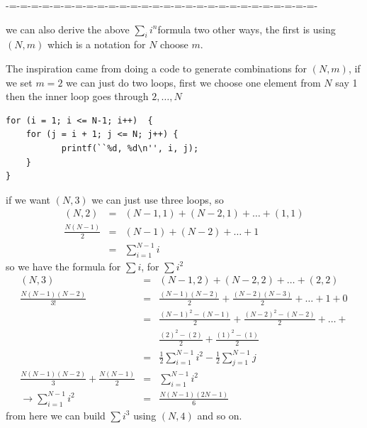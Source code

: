 \documentclass[aps,preprint,preprintnumbers,nofootinbib,showpacs,prd]{revtex4-1}
\newcommand{\nbea}{\begin{eqnarray*}}
\newcommand{\neea}{\end{eqnarray*}}
\begin{document}
-=-=-=-=-=-=-=-=-=-=-=-=-=-=-=-=-=-=-=-=-=-=-=-=-=-=-=-=-

we can also derive the above $\sum_{i} i^n$formula two other ways, the first is using $(N,m)$ which is a notation for $N$ choose $m$.

The inspiration came from doing a code to generate combinations for $(N,m)$, if we set $m=2$ we can just do two loops, first we choose one element from $N$ say 1 then the inner loop goes through $2,\dots,N$
%
\begin{Verbatim}[baselinestretch=0.75]
for (i = 1; i <= N-1; i++)  {
    for (j = i + 1; j <= N; j++) {
    	   printf(``%d, %d\n'', i, j);
    }
}
\end{Verbatim}
%
if we want $(N,3)$ we can just use three loops, so
%
\nbea
(N, 2) & = & (N-1,1) + (N-2,1) + \dots + (1,1) \\
\frac{N(N-1)}{2} & = & (N-1) + (N-2) + \dots + 1 \\
& = & \sum_{i=1}^{N-1} i
\neea
%
so we have the formula for $\sum i$, for $\sum i^2$
%
\nbea
(N, 3) & = & (N-1,2) + (N-2,2) + \dots + (2,2) \\
\frac{N(N-1)(N-2)}{3!} & = & \frac{(N-1)(N-2)}{2} + \frac{(N-2)(N-3)}{2} + \dots + 1 + 0 \\
& = & \frac{(N-1)^2 - (N-1)}{2} + \frac{(N-2)^2 - (N-2)}{2} + \dots + \\
&& \frac{(2)^2 - (2)}{2} + \frac{(1)^2 - (1)}{2} \\
& = & \frac{1}{2} \sum_{i=1}^{N-1} i^2 - \frac{1}{2} \sum_{j=1}^{N-1} j \\
\frac{N(N-1)(N-2)}{3} + \frac{N(N-1)}{2} & = & \sum_{i=1}^{N-1} i^2 \\
\to \sum_{i=1}^{N-1} i^2 & = & \frac{N(N-1)(2N - 1)}{6}
\neea
%
from here we can build $\sum i^3$ using $(N,4)$ and so on.
\end{document}
